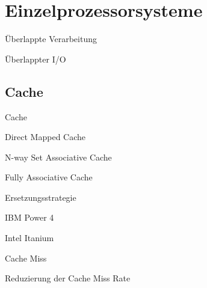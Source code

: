 
\section{Einzelprozessorsysteme}

\begin{defi}{Überlappte Verarbeitung}

\end{defi}

\begin{defi}{Überlappter I/O}

\end{defi}

\subsection{Cache}

\begin{defi}{Cache}

\end{defi}

\begin{defi}{Direct Mapped Cache}

\end{defi}

\begin{defi}{N-way Set Associative Cache}

\end{defi}

\begin{defi}{Fully Associative Cache}

\end{defi}

\begin{defi}{Ersetzungsstrategie}

\end{defi}

\begin{bonus}[Cache]{IBM Power 4}

\end{bonus}

\begin{bonus}[Cache]{Intel Itanium}

\end{bonus}

\begin{defi}{Cache Miss}

\end{defi}

\begin{defi}{Reduzierung der Cache Miss Rate}

\end{defi}

